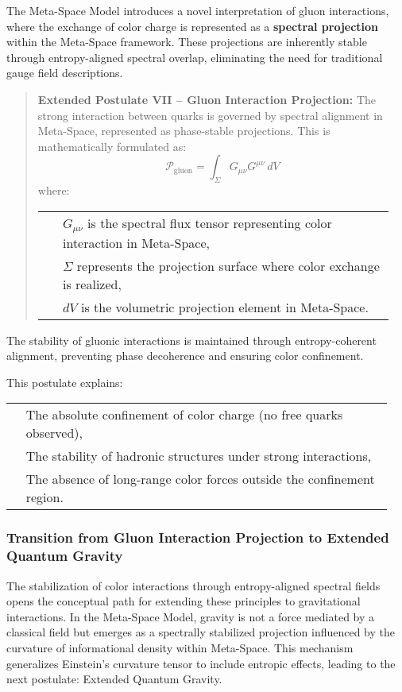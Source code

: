 \documentclass[10.5pt,a4paper]{article}
\begin{document}
The Meta-Space Model introduces a novel interpretation of gluon interactions, where the exchange of color charge 
is represented as a \textbf{spectral projection} within the Meta-Space framework. These projections are 
inherently stable through entropy-aligned spectral overlap, eliminating the need for traditional gauge field descriptions.

\begin{quote}
\textbf{Extended Postulate VII – Gluon Interaction Projection:}  
The strong interaction between quarks is governed by spectral alignment in Meta-Space, represented as 
phase-stable projections. This is mathematically formulated as:
\[
\mathcal{P}_{\text{gluon}} = \int_\Sigma G_{\mu\nu} G^{\mu\nu} \, dV
\]
where:
\begin{longtable}{@{}p{0.05\linewidth}@{\quad}p{0.9\linewidth}@{}}
 & \( G_{\mu\nu} \) is the spectral flux tensor representing color interaction in Meta-Space, \\
 & \( \Sigma \) represents the projection surface where color exchange is realized, \\
 & \( dV \) is the volumetric projection element in Meta-Space. \\
\end{longtable}
\end{quote}

The stability of gluonic interactions is maintained through entropy-coherent alignment, preventing phase 
decoherence and ensuring color confinement.

This postulate explains:
\begin{longtable}{@{}p{0.03\linewidth}@{\quad}p{0.92\linewidth}@{}}
 & The absolute confinement of color charge (no free quarks observed), \\
 & The stability of hadronic structures under strong interactions, \\
 & The absence of long-range color forces outside the confinement region. \\
\end{longtable}

\subsubsection*{Transition from Gluon Interaction Projection to Extended Quantum Gravity}

The stabilization of color interactions through entropy-aligned spectral fields opens the conceptual path 
for extending these principles to gravitational interactions. In the Meta-Space Model, gravity is not a force 
mediated by a classical field but emerges as a spectrally stabilized projection influenced by the curvature of 
informational density within Meta-Space. This mechanism generalizes Einstein's curvature tensor to include 
entropic effects, leading to the next postulate: Extended Quantum Gravity.
\end{document}
